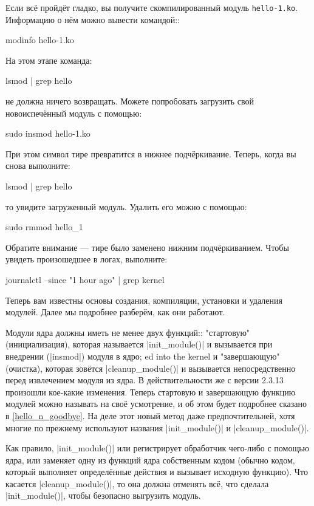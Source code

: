 \documentclass[10pt, oneside]{book}
\begin{document}
Если всё пройдёт гладко, вы получите скомпилированный модуль \verb|hello-1.ko|.
Информацию о нём можно вывести командой::
\begin{codebash}
modinfo hello-1.ko
\end{codebash}

На этом этапе команда:
\begin{codebash}
lsmod | grep hello
\end{codebash}

не должна ничего возвращать. Можете попробовать загрузить свой новоиспечённый модуль с помощью:
\begin{codebash}
sudo insmod hello-1.ko
\end{codebash}

При этом символ тире превратится в нижнее подчёркивание. Теперь, когда вы снова выполните:
\begin{codebash}
lsmod | grep hello
\end{codebash}

то увидите загруженный модуль. Удалить его можно с помощью:
\begin{codebash}
sudo rmmod hello_1
\end{codebash}

Обратите внимание — тире было заменено нижним подчёркиванием. Чтобы увидеть произошедшее в логах, выполните:
\begin{codebash}
journalctl --since "1 hour ago" | grep kernel
\end{codebash}

Теперь вам известны основы создания, компиляции, установки и удаления модулей.
Далее мы подробнее разберём, как они работают.

Модули ядра должны иметь не менее двух функций:: "стартовую" (инициализация), которая называется \cpp|init_module()| и вызывается при внедрении (\sh|insmod|) модуля в ядро; ed into the kernel и "завершающую" (очистка), которая зовётся \cpp|cleanup_module()| и вызывается непосредственно перед извлечением модуля из ядра.
В действительности же с версии 2.3.13 произошли кое-какие изменения. Теперь стартовую и завершающую функцию модулей можно называть на своё усмотрение, и об этом будет подробнее сказано в \ref{hello_n_goodbye}. На деле этот новый метод даже предпочтительней, хотя многие по прежнему используют названия \cpp|init_module()| и \cpp|cleanup_module()|.

Как правило, \cpp|init_module()| или регистрирует обработчик чего-либо с помощью ядра,
или заменяет одну из функций ядра собственным кодом (обычно кодом, который выполняет определённые действия и вызывает исходную функцию). Что касается \cpp|cleanup_module()|, то она должна отменять всё, что сделала \cpp|init_module()|, чтобы безопасно выгрузить модуль.
\end{document}
